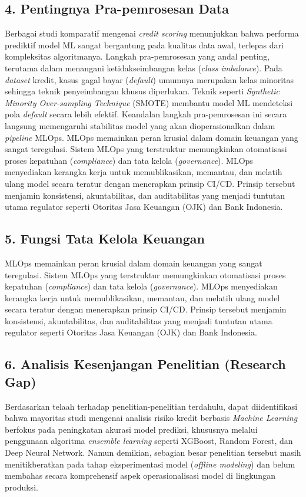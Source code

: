 \subsection*{4. Pentingnya Pra-pemrosesan Data}
Berbagai studi komparatif mengenai \textit{credit scoring} menunjukkan bahwa performa prediktif model ML sangat bergantung pada kualitas data awal, terlepas dari kompleksitas algoritmanya. Langkah pra-pemrosesan yang andal penting, terutama dalam menangani ketidakseimbangan kelas (\textit{class imbalance}). Pada \textit{dataset} kredit, kasus gagal bayar (\textit{default}) umumnya merupakan kelas minoritas sehingga teknik penyeimbangan khusus diperlukan. Teknik seperti \textit{Synthetic Minority Over-sampling Technique} (SMOTE) membantu model ML mendeteksi pola \textit{default} secara lebih efektif. Keandalan langkah pra-pemrosesan ini secara langsung memengaruhi stabilitas model yang akan dioperasionalkan dalam \textit{pipeline} MLOps.
MLOps memainkan peran krusial dalam domain keuangan yang sangat teregulasi. Sistem MLOps yang terstruktur memungkinkan otomatisasi proses kepatuhan (\textit{compliance}) dan tata kelola (\textit{governance}). MLOps menyediakan kerangka kerja untuk memublikasikan, memantau, dan melatih ulang model secara teratur dengan menerapkan prinsip CI/CD. Prinsip tersebut menjamin konsistensi, akuntabilitas, dan auditabilitas yang menjadi tuntutan utama regulator seperti Otoritas Jasa Keuangan (OJK) dan Bank Indonesia.\cite{AIMSPress2024}
\subsection*{5. Fungsi Tata Kelola Keuangan}
MLOps memainkan peran krusial dalam domain keuangan yang sangat teregulasi. Sistem MLOps yang terstruktur memungkinkan otomatisasi proses kepatuhan (\textit{compliance}) dan tata kelola (\textit{governance}). MLOps menyediakan kerangka kerja untuk memublikasikan, memantau, dan melatih ulang model secara teratur dengan menerapkan prinsip CI/CD. Prinsip tersebut menjamin konsistensi, akuntabilitas, dan auditabilitas yang menjadi tuntutan utama regulator seperti Otoritas Jasa Keuangan (OJK) dan Bank Indonesia.\cite{rafi2024explainable}

\subsection*{6. Analisis Kesenjangan Penelitian (Research Gap)}

Berdasarkan telaah terhadap penelitian-penelitian terdahulu, dapat diidentifikasi bahwa mayoritas studi mengenai analisis risiko kredit berbasis \textit{Machine Learning} berfokus pada peningkatan akurasi model prediksi, khususnya melalui penggunaan algoritma \textit{ensemble learning} seperti XGBoost, Random Forest, dan Deep Neural Network.\cite {Chang2024} Namun demikian, sebagian besar penelitian tersebut masih menitikberatkan pada tahap eksperimentasi model (\textit{offline modeling}) dan belum membahas secara komprehensif aspek operasionalisasi model di lingkungan produksi.

